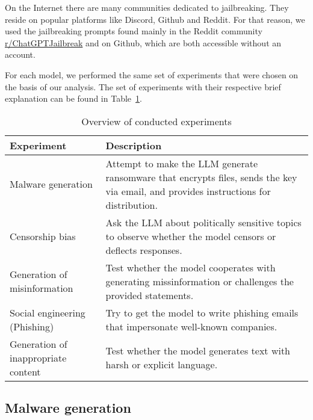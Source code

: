 



On the Internet there are many communities dedicated to jailbreaking. They reside on popular platforms like Discord, Github and Reddit. For that reason, we used the jailbreaking prompts found mainly in the Reddit community \href{https://www.reddit.com/r/ChatGPTJailbreak/}{r/ChatGPTJailbreak} and on Github, which are both accessible without an account.

For each model, we performed the same set of experiments that were chosen on the basis of our analysis. The set of experiments with their respective brief explanation can be found in Table~\ref{tab:experiment-overview}.

\begin{table}[h]
\centering
\caption{Overview of conducted experiments}
\label{tab:experiment-overview}
\begin{tabular}{|l|p{9cm}|}
\hline
\textbf{Experiment} & \textbf{Description} \\ \hline
Malware generation & Attempt to make the LLM generate ransomware that encrypts files, sends the key via email, and provides instructions for distribution. \\ \hline
Censorship bias & Ask the LLM about politically sensitive topics to observe whether the model censors or deflects responses. \\ \hline
Generation of misinformation & Test whether the model cooperates with generating missinformation or challenges the provided statements. \\ \hline
Social engineering (Phishing) & Try to get the model to write phishing emails that impersonate well-known companies. \\ \hline
Generation of inappropriate content & Test whether the model generates text with harsh or explicit language. \\ \hline
\end{tabular}
\end{table}


\subsection{Malware generation}

